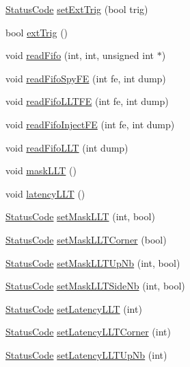 \begin{DoxyCompactItemize}
\item 
\hyperlink{classStatusCode}{Status\+Code} \hyperlink{classFEB__v1_aea3b1f84ea9be2e5c55a93ae215c8a35}{set\+Ext\+Trig} (bool trig)
\item 
bool \hyperlink{classFEB__v1_a481e089490ae958c7606f11d27c9db9a}{ext\+Trig} ()
\item 
void \hyperlink{classFEB__v1_af945f99a912c5ad076ebdb03dbb6c139}{read\+Fifo} (int, int, unsigned int $\ast$)
\item 
void \hyperlink{classFEB__v1_a86e0ed4fc9946a184d82cefdf5e5a794}{read\+Fifo\+Spy\+FE} (int fe, int dump)
\item 
void \hyperlink{classFEB__v1_a27df6aecacccf3415ff98092b7da5485}{read\+Fifo\+L\+L\+T\+FE} (int fe, int dump)
\item 
void \hyperlink{classFEB__v1_ab370d9f02895e1a44ab19d320255123e}{read\+Fifo\+Inject\+FE} (int fe, int dump)
\item 
void \hyperlink{classFEB__v1_a449a15db7087e4dbe6af0b0f96ec2038}{read\+Fifo\+L\+LT} (int dump)
\item 
void \hyperlink{classFEB__v1_a14807bfa77f92bb82428c39abea5df88}{mask\+L\+LT} ()
\item 
void \hyperlink{classFEB__v1_a42cc3f61fd94d4de68eb605b04fb1e74}{latency\+L\+LT} ()
\item 
\hyperlink{classStatusCode}{Status\+Code} \hyperlink{classFEB__v1_a5a177c98b2be429aacbb3d652f40b247}{set\+Mask\+L\+LT} (int, bool)
\item 
\hyperlink{classStatusCode}{Status\+Code} \hyperlink{classFEB__v1_ad078f7c2086dd78375da9d9d82b78d23}{set\+Mask\+L\+L\+T\+Corner} (bool)
\item 
\hyperlink{classStatusCode}{Status\+Code} \hyperlink{classFEB__v1_a904bff89e5ad45ce78730502dc26a0e3}{set\+Mask\+L\+L\+T\+Up\+Nb} (int, bool)
\item 
\hyperlink{classStatusCode}{Status\+Code} \hyperlink{classFEB__v1_a519a955361c420680af64c7fa9410784}{set\+Mask\+L\+L\+T\+Side\+Nb} (int, bool)
\item 
\hyperlink{classStatusCode}{Status\+Code} \hyperlink{classFEB__v1_abf7b8a0e6842ecf74a2b1889fbb9a722}{set\+Latency\+L\+LT} (int)
\item 
\hyperlink{classStatusCode}{Status\+Code} \hyperlink{classFEB__v1_a935e78031961cff9330e82a70bf91052}{set\+Latency\+L\+L\+T\+Corner} (int)
\item 
\hyperlink{classStatusCode}{Status\+Code} \hyperlink{classFEB__v1_a8a3aafdda0f1028e02c4a5850f987f32}{set\+Latency\+L\+L\+T\+Up\+Nb} (int)
\item 

\end{DoxyCompactItemize}
